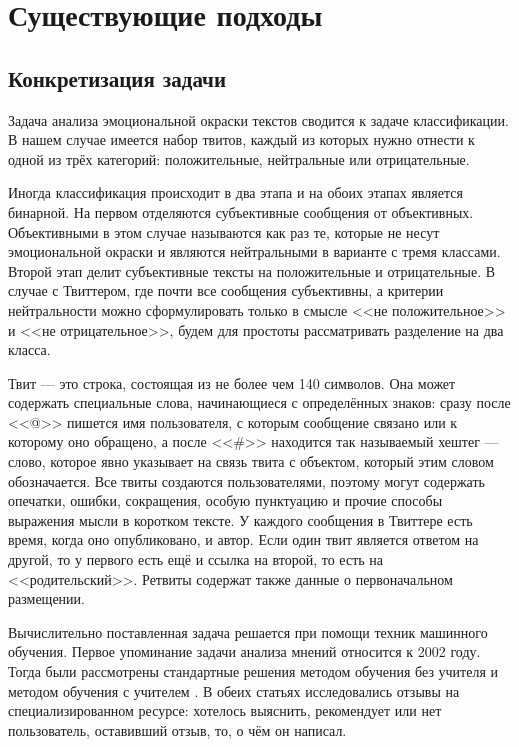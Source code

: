 \section{Существующие подходы}

\subsection{Конкретизация задачи}
Задача анализа эмоциональной окраски текстов сводится к задаче классификации. В
нашем случае имеется набор твитов, каждый из которых нужно отнести к одной из
трёх категорий: положительные, нейтральные или отрицательные.

Иногда классификация происходит в два этапа и на обоих этапах является бинарной.
На первом отделяются субъективные сообщения от объективных. Объективными в этом
случае называются как раз те, которые не несут эмоциональной окраски и
являются нейтральными в варианте с тремя классами. Второй этап делит субъективные
тексты на положительные и отрицательные. В случае с Твиттером, где почти все
сообщения субъективны, а критерии нейтральности можно сформулировать только в
смысле <<не положительное>> и <<не отрицательное>>, будем для простоты рассматривать разделение
на два класса.

Твит --- это строка, состоящая из не более чем 140 символов. Она может содержать
специальные слова, начинающиеся с определённых знаков: сразу после <<@>> пишется
имя пользователя, с которым сообщение связано или к которому оно обращено,
а после <<\#>> находится так называемый хештег --- слово, которое явно указывает
на связь твита с объектом, который этим словом обозначается. Все твиты создаются
пользователями, поэтому могут содержать опечатки, ошибки, сокращения,
особую пунктуацию и прочие способы выражения мысли в коротком тексте.
У каждого сообщения в Твиттере есть время, когда оно опубликовано, и автор.
Если один твит является ответом на другой, то у первого есть ещё и ссылка на второй,
то есть на <<родительский>>. Ретвиты содержат также данные о первоначальном
размещении.

Вычислительно поставленная задача решается при помощи техник машинного обучения. Первое
упоминание задачи анализа мнений относится к 2002 году. Тогда были рассмотрены
стандартные решения методом обучения без учителя \cite{turney2002thumbs} и методом обучения с
учителем \cite{pang2002thumbs}. В обеих статьях исследовались отзывы на
специализированном ресурсе: хотелось выяснить, рекомендует или нет пользователь, оставивший отзыв,
то, о чём он написал.

